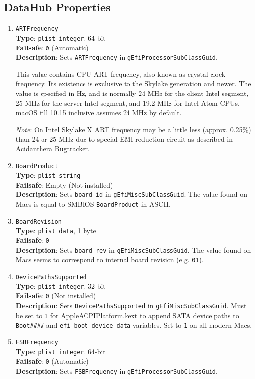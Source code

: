 \documentclass[]{article}
\begin{document}
\subsection{DataHub Properties}\label{platforminfodatahub}

\begin{enumerate}

\item
  \texttt{ARTFrequency}\\
  \textbf{Type}: \texttt{plist\ integer}, 64-bit\\
  \textbf{Failsafe}: \texttt{0} (Automatic)\\
  \textbf{Description}: Sets \texttt{ARTFrequency} in
  \texttt{gEfiProcessorSubClassGuid}.

  This value contains CPU ART frequency, also known as crystal clock frequency.
  Its existence is exclusive to the Skylake generation and newer. The value is specified
  in Hz, and is normally 24 MHz for the client Intel segment, 25 MHz for the server Intel segment,
  and 19.2 MHz for Intel Atom CPUs. macOS till 10.15 inclusive assumes 24 MHz by default.

  \emph{Note}: On Intel Skylake X ART frequency may be a little less (approx. 0.25\%) than
  24 or 25 MHz due to special EMI-reduction circuit as described in
  \href{https://github.com/acidanthera/bugtracker/issues/448#issuecomment-524914166}{Acidanthera Bugtracker}.
\item
  \texttt{BoardProduct}\\
  \textbf{Type}: \texttt{plist\ string}\\
  \textbf{Failsafe}: Empty (Not installed)\\
  \textbf{Description}: Sets \texttt{board-id} in
  \texttt{gEfiMiscSubClassGuid}. The value found on Macs is equal to SMBIOS
  \texttt{BoardProduct} in ASCII.
\item
  \texttt{BoardRevision}\\
  \textbf{Type}: \texttt{plist\ data}, 1 byte\\
  \textbf{Failsafe}: \texttt{0}\\
  \textbf{Description}: Sets \texttt{board-rev} in
  \texttt{gEfiMiscSubClassGuid}. The value found on Macs seems to correspond
  to internal board revision (e.g. \texttt{01}).
\item
  \texttt{DevicePathsSupported}\\
  \textbf{Type}: \texttt{plist\ integer}, 32-bit\\
  \textbf{Failsafe}: \texttt{0} (Not installed)\\
  \textbf{Description}: Sets \texttt{DevicePathsSupported} in
  \texttt{gEfiMiscSubClassGuid}. Must be set to \texttt{1} for
  AppleACPIPlatform.kext to append SATA device paths to
  \texttt{Boot\#\#\#\#} and \texttt{efi-boot-device-data} variables.
  Set to \texttt{1} on all modern Macs.
\item
  \texttt{FSBFrequency}\\
  \textbf{Type}: \texttt{plist\ integer}, 64-bit\\
  \textbf{Failsafe}: \texttt{0} (Automatic)\\
  \textbf{Description}: Sets \texttt{FSBFrequency} in
  \texttt{gEfiProcessorSubClassGuid}.


\end{enumerate}
\end{document}
